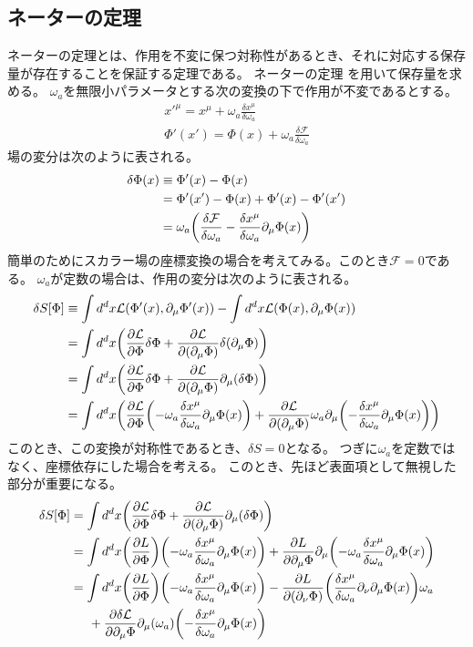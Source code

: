 \documentclass[11pt, dvipdfmx]{article}
\numberwithin{equation}{section}
\begin{document}
\subsection{ネーターの定理}
ネーターの定理とは、作用を不変に保つ対称性があるとき、それに対応する保存量が存在することを保証する定理である。
ネーターの定理
を用いて保存量を求める。
$\omega_a$を無限小パラメータとする次の変換の下で作用が不変であるとする。
\begin{align}
    x'^\mu=x^\mu+\omega_a\frac{\delta x^\mu}{\delta \omega_a}
    \\
    \Phi'(x')=\Phi(x)+\omega_a \frac{\delta \mathcal{F}}{\delta \omega_a}\label{field transformation}
\end{align}
場の変分は次のように表される。
\begin{align}
    \delta \Phi(x) &\equiv \Phi'(x)-\Phi(x)\notag\\
    &= \Phi'(x') - \Phi(x) + \Phi'(x) - \Phi'(x')\notag\\
    &= \omega_a\qty(\frac{\delta \mathcal{F}}{\delta \omega_a} - \frac{\delta x^\mu}{\delta \omega_a}\partial_\mu \Phi(x))
\end{align}
簡単のためにスカラー場の座標変換の場合を考えてみる。このとき$\mathcal{F}=0$である。
$\omega_a$が定数の場合は、作用の変分は次のように表される。
\begin{align}
    \delta S[\Phi] &\equiv\int d^dx \mathcal{L}(\Phi'(x),\partial_\mu \Phi'(x)) - \int d^dx \mathcal{L}(\Phi(x),\partial_\mu \Phi(x))\notag\\
    &= \int d^dx \qty(\pdv{\mathcal{L}}{\Phi}\delta \Phi + \pdv{\mathcal{L}}{(\partial_\mu \Phi)}\delta(\partial_\mu \Phi))\notag\\
    &= \int d^dx \qty(\pdv{\mathcal{L}}{\Phi}\delta \Phi + \pdv{\mathcal{L}}{(\partial_\mu \Phi)}\partial_\mu(\delta \Phi))\notag\\
    &=\int d^dx \qty(\pdv{\mathcal{L}}{\Phi} \qty(-\omega_a\frac{\delta x^\mu}{\delta\omega_a}\partial_\mu \Phi(x)) + \pdv{\mathcal{L}}{(\partial_\mu \Phi)}\omega_a\partial_\mu\qty(-\frac{\delta x^\mu}{\delta\omega_a}\partial_\mu \Phi(x)))
 \end{align}
このとき、この変換が対称性であるとき、$\delta S=0$となる。
   つぎに$\omega_a$を定数ではなく、座標依存にした場合を考える。
   このとき、先ほど表面項として無視した部分が重要になる。
   \begin{align}
   \delta S[\Phi]
    &= \int d^dx \qty(\pdv{\mathcal{L}}{\Phi}\delta \Phi + \pdv{\mathcal{L}}{(\partial_\mu \Phi)}\partial_\mu(\delta \Phi))\notag\\
   &= \int d^dx \qty(\pdv{L}{\Phi})\qty(-\omega_a\frac{\delta x^\mu}{\delta\omega_a}\partial_\mu \Phi(x))+\pdv{L}{\partial_\mu \Phi}\partial_\mu\qty(-\omega_a\frac{\delta x^\mu}{\delta\omega_a}\partial_\mu \Phi(x))\notag\\
   &=\int d^dx \qty(\pdv{L}{\Phi})\qty(-\omega_a\frac{\delta x^\mu}{\delta\omega_a}\partial_\mu \Phi(x))-\pdv{L}{(\partial_\nu \Phi)}\qty(\frac{\delta x^\mu}{\delta\omega_a}\partial_\nu\partial_\mu \Phi(x))\omega_a\notag\\
   &\hspace{5mm}+\pdv{\delta \mathcal{L}}{\partial_\mu \Phi} \partial_\mu(\omega_a)\qty(-\frac{\delta x^\mu}{\delta\omega_a}\partial_\mu \Phi(x))
\end{align}
\end{document}
